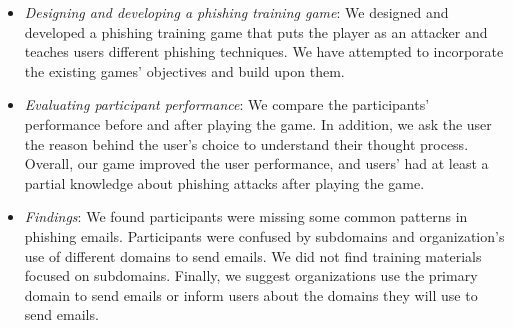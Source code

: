 \begin{itemize}
    \item \textit{Designing and developing a phishing training game}: We designed and developed a phishing training game that puts the player as an attacker and teaches users different phishing techniques. We have attempted to incorporate the existing games' objectives and build upon them.
    \item \textit{Evaluating participant performance}: We compare the participants' performance before and after playing the game. In addition, we ask the user the reason behind the user's choice to understand their thought process. Overall, our game improved the user performance, and users' had at least a partial knowledge about phishing attacks after playing the game.
    \item \textit{Findings}: We found participants were missing some common patterns in phishing emails. Participants were confused by subdomains and organization's use of different domains to send emails. We did not find training materials focused on subdomains. Finally, we suggest organizations use the primary domain to send emails or inform users about the domains they will use to send emails.
\end{itemize}




